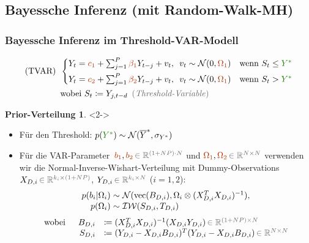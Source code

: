 \documentclass[10pt]{beamer}
\theoremstyle{definition}
\newtheorem*{prior}{Prior-Verteilung}
\newcommand{\R}{\mathbb{R}} %
\DeclareMathOperator{\Vector}{vec} %
\newcommand{\Normal}{\mathcal{N}} %
\newcommand{\InverseWishart}{\mathcal{IW}} %
\newcommand{\stepOne}[1]{\textcolor{StepOneColor}{#1}}
\newcommand{\stepTwo}[1]{\textcolor{StepTwoColor}{#1}}
\newcommand{\typeInfo}[1]{\textcolor{TypeInfoColor}{#1}}
\begin{document}
\subsection{Bayessche Inferenz (mit Random-Walk-MH)}

\begin{frame}
  \frametitle{Bayessche Inferenz im Threshold-VAR-Modell}
  \begin{modelbox}
    \begin{align*}
      \text{(TVAR)} \enspace
      & \begin{cases}
        Y_t = \stepOne{c_1} + \sum_{j=1}^P \stepOne{\beta_1} Y_{t-j} + v_t, \enspace
        v_t \sim \Normal(0, \stepOne{\Omega_1})
        & \text{wenn } S_t \leq \stepTwo{Y^*} \\[4pt]
        Y_t = \stepOne{c_2} + \sum_{j=1}^P \stepOne{\beta_2} Y_{t-j} + v_t, \enspace
        v_t \sim \Normal(0, \stepOne{\Omega_1})
        & \text{wenn } S_t > \stepTwo{Y^*}
      \end{cases} \\
      & \text{wobei } S_t \coloneqq Y_{j, t-d} \enspace \text{\typeInfo{(\emph{Threshold-Variable})}}
    \end{align*}
  \end{modelbox}

  \begin{prior}<2->
    \begin{itemize}
      \item<3-> Für den Threshold: \quad $p(\stepTwo{Y^*}) \sim \Normal(\overline{Y}^*, \sigma_{Y^*})$
      \item<4-> Für die \stepOne{VAR-Parameter}~$\stepOne{b_1}, \stepOne{b_2} \, \typeInfo{\in \R^{(1 + NP) \cdot N}}$ und $\stepOne{\Omega_1}, \stepOne{\Omega_2} \, \typeInfo{\in \R^{N \times N}}$ verwenden wir die Normal-Inverse-Wishart-Verteilung mit Dummy-Observations $X_{D,i} \, \typeInfo{\in \R^{k_i \times (1 + NP)}}$, $Y_{D,i} \, \typeInfo{\in \R^{k_i \times N}}$ ($i = 1,2$):
      \[
        \arraycolsep=1.5pt
        \begin{array}{rcl}
          p(b_i | \Omega_i) &\sim& \Normal(\Vector(B_{D,i}), \Omega_i \otimes (X_{D,i}^T X_{D,i})^{-1}), \\
          p(\Omega_i) &\sim& \InverseWishart(S_{D,i}, T_{D,i})
        \end{array}
      \]
      \[
        \begin{array}{rrl}
          \text{wobei} \enspace
          & B_{D,i} & \coloneqq (X_{D,i}^T X_{D,i})^{-1} (X_{D,i} Y_{D,i}) \, \typeInfo{\in \R^{(1 + NP) \times N}} \\
          & S_{D,i} & \coloneqq (Y_{D,i} - X_{D,i} B_{D,i})^T (Y_{D,i} - X_{D,i} B_{D,i}) \, \typeInfo{\in \R^{N \times N}}
        \end{array}
      \]
    \end{itemize}
  \end{prior}
\end{frame}
\end{document}
